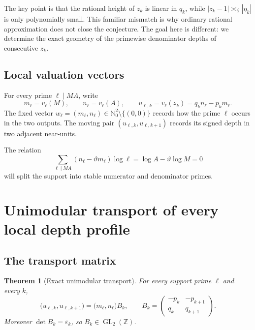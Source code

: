 \documentclass[11pt,oneside]{article}
\newtheorem{theorem}{Theorem}[section]
\theoremstyle{definition}
\theoremstyle{remark}
\newcommand{\Nzero}{\mathbb N_0}
\newcommand{\Z}{\mathbb Z}
\newcommand{\thetaq}{\vartheta}
\newcommand{\eps}{\varepsilon}
\newcommand{\GL}{\operatorname{GL}}
\begin{document}
The key point is that the rational height of $z_k$ is linear in $q_k$, while
$|z_k-1|\asymp_\beta|\eta_k|$ is only polynomially small.  This familiar mismatch is why
ordinary rational approximation does not close the conjecture.  The goal here is different:
we determine the exact geometry of the primewise denominator depths of consecutive $z_k$.

\subsection{Local valuation vectors}

For every prime $\ell\mid MA$, write
\begin{equation}
 m_\ell=v_\ell(M),\qquad n_\ell=v_\ell(A),
 \qquad
 u_{\ell,k}=v_\ell(z_k)=q_kn_\ell-p_km_\ell.
 \label{eq:local-depth}
\end{equation}
The fixed vector $w_\ell=(m_\ell,n_\ell)\in\Nzero^2\setminus\{(0,0)\}$ records how the
prime $\ell$ occurs in the two outputs.  The moving pair
$(u_{\ell,k},u_{\ell,k+1})$ records its signed depth in two adjacent near-units.

The relation
\begin{equation}
 \sum_{\ell\mid MA}(n_\ell-\thetaq m_\ell)\log\ell
 =\log A-\thetaq\log M=0
 \label{eq:weighted-balance}
\end{equation}
will split the support into stable numerator and denominator primes.

\section{Unimodular transport of every local depth profile}
\label{sec:unimodular}

\subsection{The transport matrix}

\begin{theorem}[Exact unimodular transport]
\label{thm:unimodular-transport}
For every support prime $\ell$ and every $k$,
\begin{equation}
 \bigl(u_{\ell,k},u_{\ell,k+1}\bigr)
 =\bigl(m_\ell,n_\ell\bigr)B_k,
 \qquad
 B_k=
 \begin{pmatrix}
 -p_k&-p_{k+1}\\
 q_k&q_{k+1}
 \end{pmatrix}.
 \label{eq:transport-matrix}
\end{equation}
Moreover $\det B_k=\eps_k$, so $B_k\in\GL_2(\Z)$.
\end{theorem}
\end{document}
